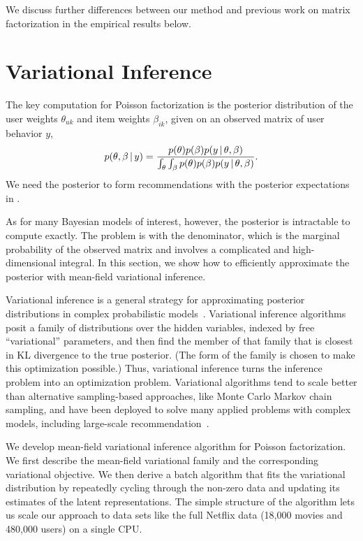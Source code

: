 \documentclass{sig-alternate}
\begin{document}
We discuss further differences between our method and previous work on
matrix factorization in the empirical results below.


\section{Variational Inference}
\label{sec:inference}

The key computation for Poisson factorization is the posterior
distribution of the user weights $\theta_{uk}$ and item
weights $\beta_{ik}$, given on an observed matrix of user behavior
$y$,
\begin{equation*}
  p(\theta, \beta \,\vert\, y) = \frac{p(\theta) p(\beta) p(y \,\vert\, \theta, \beta)}
  {\int_{\theta} \int_{\beta} p(\theta) p(\beta) p(y \,\vert\, \theta, \beta)}.
\end{equation*}
We need the posterior to form recommendations with the posterior
expectations in .

As for many Bayesian models of interest, however, the posterior is
intractable to compute exactly.  The problem is with the denominator,
which is the marginal probability of the observed matrix and involves
a complicated and high-dimensional integral.  In this section, we show
how to efficiently approximate the posterior with mean-field
variational inference.

Variational inference is a general strategy for approximating
posterior distributions in complex probabilistic
models~\cite{Jordan:1999,Wainwright:2008}.  Variational inference
algorithms posit a family of distributions over the hidden variables,
indexed by free ``variational'' parameters, and then find the member
of that family that is closest in KL divergence to the true posterior.
(The form of the family is chosen to make this optimization possible.)
Thus, variational inference turns the inference problem into an
optimization problem.  Variational algorithms tend to scale better
than alternative sampling-based approaches, like Monte Carlo Markov
chain sampling, and have been deployed to solve many applied problems
with complex models, including large-scale recommendation~\cite{Paquet:2013p9197}.

We develop mean-field variational inference algorithm for Poisson
factorization.  We first describe the mean-field variational family
and the corresponding variational objective.  We then derive a batch
algorithm that fits the variational distribution by repeatedly cycling
through the non-zero data and updating its estimates of the latent
representations. The simple structure of the algorithm lets us scale
our approach to data sets like the full Netflix data (18,000 movies
and 480,000 users) on a single CPU.
\end{document}
